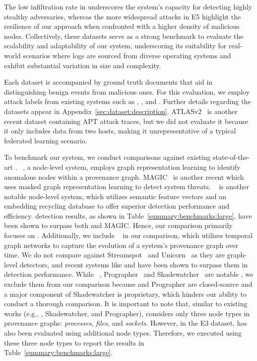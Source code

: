 The low infiltration rate in \optc underscores the system’s capacity for detecting highly stealthy adversaries, whereas the more widespread attacks in E5 highlight the resilience of our approach when confronted with a higher density of malicious nodes. Collectively, these datasets serve as a strong benchmark to evaluate the scalability and adaptability of our system, underscoring its suitability for real-world scenarios where logs are sourced from diverse operating systems and exhibit substantial variation in size and complexity.

Each \darpa dataset is accompanied by ground truth documents that aid in distinguishing benign events from malicious ones. For this evaluation, we employ attack labels from existing systems such as \threatrace, \kairos, and \flash. Further details regarding the datasets appear in Appendix~\ref{sec:dataset:description}. ATLASv2~\cite{riddle2023atlasv2} is another recent dataset containing APT attack traces, but we did not evaluate it because it only includes data from two hosts, making it unrepresentative of a typical federated learning scenario.

 To benchmark our system, we conduct comparisons against existing state-of-the-art \pids. \threatrace~\cite{wang2022threatrace}, a node-level system, employs graph representation learning to identify anomalous nodes within a provenance graph. MAGIC~\cite{jia2023magic} is another recent \pids which uses masked graph representation learning to detect system threats. \flash~\cite{flash2024} is another notable node-level system, which utilizes semantic feature vectors and an embedding recycling database to offer superior detection performance and efficiency. \flash detection results, as shown in Table~\ref{summary:benchmarks:large}, have been shown to surpass both \threatrace and MAGIC. Hence, our comparison primarily focuses on \flash. Additionally, we include \kairos~\cite{cheng2023kairos} in our comparison, which utilizes temporal graph networks to capture the evolution of a system's provenance graph over time. We do not compare against Streamspot~\cite{streamspot} and Unicorn~\cite{han2020unicorn} as they are graph-level detectors, and recent systems like \threatrace and \flash have been shown to surpass them in detection performance. While \disdet~\cite{dong2023distdet}, Prographer~\cite{yangprographer} and Shadewatcher~\cite{shadewatcher} are notable \pids, we exclude them from our comparison because \disdet and Prographer are closed-source and a major component of Shadewatcher is proprietary, which hinders our ability to conduct a thorough comparison. It is important to note that, similar to existing works (e.g., \kairos, Shadewatcher, and Prographer), \Sys considers only three node types in provenance graphs: \emph{processes}, \emph{files}, and \emph{sockets}. However, in the E3 dataset, \flash has also been evaluated using additional node types. Therefore, we executed \flash using these three node types to report the results in Table~\ref{summary:benchmarks:large}.

